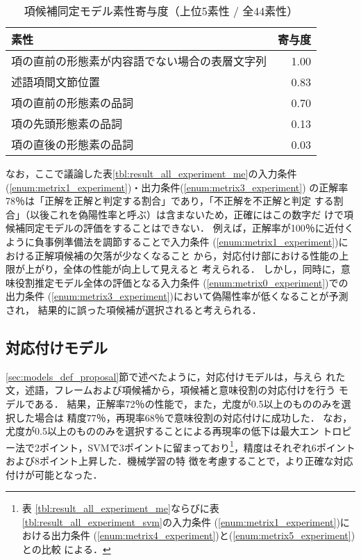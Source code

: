 \documentclass[japanese]{jnlp_1.2b}
\begin{document}
\begin{table}[t]
 \begin{center}
  \caption{項候補同定モデル素性寄与度（上位5素性 / 全44素性）}
  \label{tbl:fenil_feature_discussion}
  \begin{tabular}{lr}
   \hline
   素性 & 寄与度 \\
   \hline
   項の直前の形態素が内容語でない場合の表層文字列 & 1.00 \\
   述語項間文節位置 & 0.83 \\
   項の直前の形態素の品詞 & 0.70 \\
   項の先頭形態素の品詞 & 0.13 \\
   項の直後の形態素の品詞 & 0.03 \\
   \hline
  \end{tabular}
 \end{center}
\end{table}




なお，ここで議論した表\ref{tbl:result_all_experiment_me}の入力条件
(\ref{enum:metrix1_experiment})・出力条件(\ref{enum:metrix3_experiment})
の正解率78％は「正解を正解と判定する割合」であり，「不正解を不正解と判定
する割合」（以後これを偽陽性率と呼ぶ）は含まないため，正確にはこの数字だ
けで項候補同定モデルの評価をすることはできない．
例えば，正解率が100％に近付くように負事例準備法を調節することで入力条件
(\ref{enum:metrix1_experiment})における正解項候補の欠落が少なくなること
から，対応付け部における性能の上限が上がり，全体の性能が向上して見えると
考えられる．
しかし，同時に，意味役割推定モデル全体の評価となる入力条件
(\ref{enum:metrix0_experiment})での出力条件
(\ref{enum:metrix3_experiment})において偽陽性率が低くなることが予測され，
結果的に誤った項候補が選択されると考えられる．




\subsection*{対応付けモデル}

\ref{sec:models_def_proposal}節で述べたように，対応付けモデルは，与えら
れた文，述語，フレームおよび項候補から，項候補と意味役割の対応付けを行う
モデルである．
結果，正解率72％の性能で，また，尤度が0.5以上のもののみを選択した場合は
精度77％，再現率68％で意味役割の対応付けに成功した．
なお，尤度が0.5以上のもののみを選択することによる再現率の低下は最大エン
トロピー法で2ポイント，SVMで3ポイントに留まっており\footnote{表
\ref{tbl:result_all_experiment_me}ならびに表
\ref{tbl:result_all_experiment_svm}の入力条件
(\ref{enum:metrix1_experiment})における出力条件
(\ref{enum:metrix4_experiment})と(\ref{enum:metrix5_experiment})との比較
による．}，精度はそれぞれ6ポイントおよび8ポイント上昇した．機械学習の特
徴を考慮することで，より正確な対応付けが可能となった．
\end{document}
